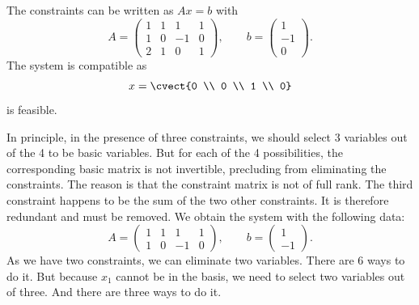 
The constraints can be written as $Ax=b$ with
\[
  A=\begin{pmatrix}
  1 & 1 & 1 & 1 \\
  1 & 0 & -1 & 0 \\
  2 & 1 & 0 & 1 
\end{pmatrix}, \qquad b = \begin{pmatrix}
1\\ -1\\ 0
  \end{pmatrix}.
  \]
  The system is compatible as
  \[
x = \cvect{0 \\ 0 \\ 1 \\ 0}
  \]
  is feasible.

In principle, in the presence of three constraints, we should select 3
variables out of the 4 to be basic variables. But for each of the 4
possibilities, the corresponding basic matrix is not invertible,
precluding from eliminating the constraints. The reason is that the
constraint matrix is not of full rank.  The third constraint happens
to be the sum of the two other constraints. It is therefore redundant
and must be removed. We obtain the system with the following data:
\[
A=\begin{pmatrix}
  1 & 1 & 1 & 1 \\
  1 & 0 & -1 & 0
\end{pmatrix}, \qquad b = \begin{pmatrix}
1\\ -1
\end{pmatrix}.
\]
As we have two constraints, we can eliminate two variables. There are
6 ways to do it. But because $x_1$ cannot be in the basis, we need to
select two variables out of three.  And there are three ways to do it.

